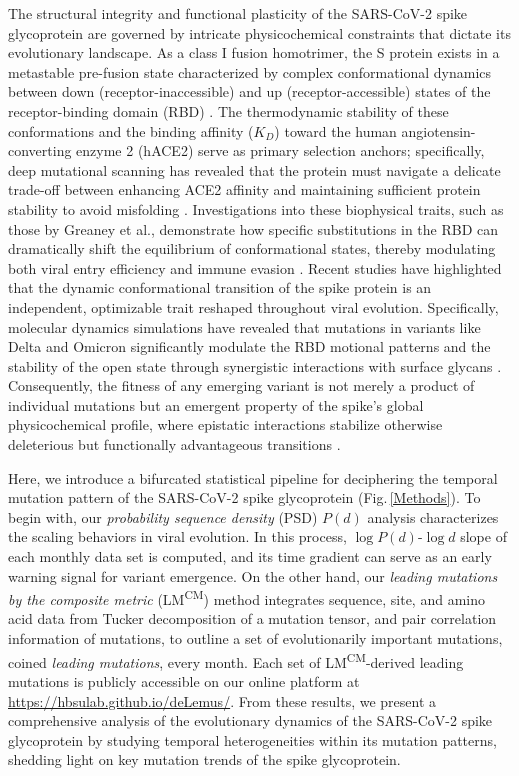 \documentclass[%
 reprint,
superscriptaddress,
 amsmath,amssymb,
 aps,
]{revtex4-2}
\begin{document}
The structural integrity and functional plasticity of the SARS-CoV-2 spike glycoprotein are governed by intricate physicochemical constraints that dictate its evolutionary landscape. As a class I fusion homotrimer, the S protein exists in a metastable pre-fusion state characterized by complex conformational dynamics between down (receptor-inaccessible) and up (receptor-accessible) states of the receptor-binding domain (RBD) \cite{Walls2020, WrappScience2020}. The thermodynamic stability of these conformations and the binding affinity ($K_D$) toward the human angiotensin-converting enzyme 2 (hACE2) serve as primary selection anchors; specifically, deep mutational scanning has revealed that the protein must navigate a delicate trade-off between enhancing ACE2 affinity and maintaining sufficient protein stability to avoid misfolding \cite{starr_deep_2020}. Investigations into these biophysical traits, such as those by Greaney et al., demonstrate how specific substitutions in the RBD can dramatically shift the equilibrium of conformational states, thereby modulating both viral entry efficiency and immune evasion \cite{greaney_mapping_2021}. Recent studies have highlighted that the dynamic conformational transition of the spike protein is an independent, optimizable trait reshaped throughout viral evolution. Specifically, molecular dynamics simulations have revealed that mutations in variants like Delta and Omicron significantly modulate the RBD motional patterns and the stability of the open state through synergistic interactions with surface glycans \cite{xu_evolutionary_2026}. Consequently, the fitness of any emerging variant is not merely a product of individual mutations but an emergent property of the spike's global physicochemical profile, where epistatic interactions stabilize otherwise deleterious but functionally advantageous transitions \cite{Starr2022Science}.

Here, we introduce a bifurcated statistical pipeline for deciphering the temporal mutation pattern of the SARS-CoV-2 spike glycoprotein (Fig.\,\ref{Methods}). To begin with, our \textit{probability sequence density} (PSD) $P(\mathit{d})$ analysis characterizes the scaling behaviors in viral evolution. In this process, $\log{P(\mathit{d})}$-$\log{\mathit{d}}$ slope of each monthly data set is computed, and its time gradient can serve as an early warning signal for variant emergence. On the other hand, our \textit{leading mutations by the composite metric} (LM\textsuperscript{CM}) method integrates sequence, site, and amino acid data from Tucker decomposition of a mutation tensor, and pair correlation information of mutations, to outline a set of evolutionarily important mutations, coined \textit{leading mutations}, every month. Each set of LM\textsuperscript{CM}-derived leading mutations is publicly accessible on our online platform at \href{https://hbsulab.github.io/deLemus/}{https://hbsulab.github.io/deLemus/}. From these results, we present a comprehensive analysis of the evolutionary dynamics of the SARS-CoV-2 spike glycoprotein by studying temporal heterogeneities within its mutation patterns, shedding light on key mutation trends of the spike glycoprotein.
\end{document}
